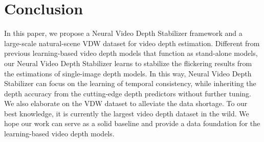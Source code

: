 \documentclass[10pt,twocolumn,letterpaper]{article}
\def\framework{Neural Video Depth Stabilizer}
\def\data{VDW}
\def\reftab{Table}
\begin{document}
\begin{table}[!t]
    \centering
    
\hspace{-3pt}
    \hspace{+18pt}
    \caption{\textbf{Baselines without NVDS stabilization network and reference frames numbers} . The experiment is conducted on the same VDW subset as \reftab{}~\ref{tab:clipop}.}
    \label{tab:nostab}
    
\end{table}



\section{Conclusion}
In this paper, we propose a \framework{} framework and a large-scale natural-scene \data{} dataset for video depth estimation. Different from previous learning-based video depth models that function as stand-alone models, our \framework{} learns to stabilize the flickering results from the estimations of single-image depth models. In this way, \framework{} can focus on the learning of temporal consistency, while inheriting the depth accuracy from the cutting-edge depth predictors without further tuning. We also elaborate on the \data{} dataset to alleviate the data shortage. To our best knowledge, it is currently the largest video depth dataset in the wild. We hope our work can serve as a solid baseline and provide a data foundation for the learning-based video depth models.
\end{document}
